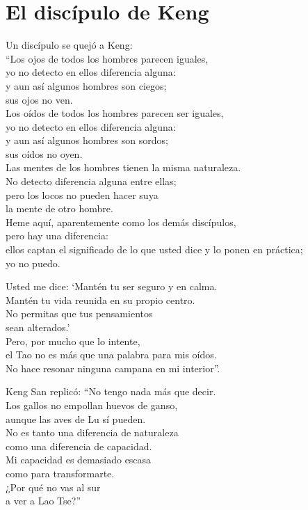 \documentclass[hidelinks]{memoir}
\begin{document}
	\chapter*{El discípulo de Keng}
	
	Un discípulo se quejó a Keng:\\
	``Los ojos de todos los hombres parecen iguales,\\
	yo no detecto en ellos diferencia alguna:\\
	y aun así algunos hombres son ciegos;\\
	sus ojos no ven.\\
	Los oídos de todos los hombres parecen ser iguales,\\
	yo no detecto en ellos diferencia alguna:\\
	y aun así algunos hombres son sordos;\\
	sus oídos no oyen.\\
	Las mentes de los hombres tienen la misma naturaleza.\\
	No detecto diferencia alguna entre ellas;\\
	pero los locos no pueden hacer suya\\
	la mente de otro hombre.\\
	Heme aquí, aparentemente como los demás discípulos,\\
	pero hay una diferencia:\\
	ellos captan el significado de lo que usted dice y lo ponen en
	práctica;\\
	yo no puedo.
	
	Usted me dice: `Mantén tu ser seguro y en calma.\\
	Mantén tu vida reunida en su propio centro.\\
	No permitas que tus pensamientos\\
	sean alterados.'\\
	Pero, por mucho que lo intente,\\
	el Tao no es más que una palabra para mis oídos.\\
	No hace resonar ninguna campana en mi interior''.
	
	Keng San replicó: ``No tengo nada más que decir.\\
	Los gallos no empollan huevos de ganso,\\
	aunque las aves de Lu sí pueden.\\
	No es tanto una diferencia de naturaleza\\
	como una diferencia de capacidad.\\
	Mi capacidad es demasiado escasa\\
	como para transformarte.\\
	¿Por qué no vas al sur\\
	a ver a Lao Tse?''
	
\end{document}
